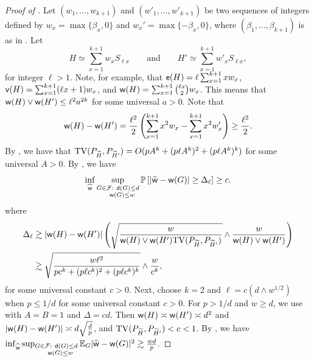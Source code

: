 \begin{proof}[Proof of ]
Let $ (w_1, \dots, w_{k+1}) $ and $ (w'_1, \dots, w'_{k+1}) $ be two sequences of integers defined by  $w_x=\max\{\beta_x,0\}$ and $w_x'=\max\{-\beta_x,0\}$, where $ (\beta_1, \dots, \beta_{k+1}) $ is as in . Let 
\begin{equation*} 
H \simeq \sum_{x=1}^{k+1} w_x S_{\ell x} \qquad \text{and} \qquad H' \simeq \sum_{x=1}^{k+1} w'_x S_{\ell x},
\end{equation*}
for integer $ \ell > 1 $.
Note, for example, that $ {\mathsf{e}}(H) = \ell\sum_{x=1}^{k+1} xw_x $, $ {\mathsf{v}}(H) = \sum_{x=1}^{k+1} (\ell x+1)w_x $, and $ {\mathsf{w}}(H) =\sum_{x=1}^{k+1} \binom{\ell x}{2}w_x $. This means that $ {\mathsf{w}}(H) \vee {\mathsf{w}}(H') \leq \ell^2 a^{2k} $ for some universal $ a > 0 $. Note that
\begin{equation*}
{\mathsf{w}}(H) - {\mathsf{w}}(H') = \frac{\ell^2}{2}\left(\sum_{x=1}^{k+1} x^2w_x - \sum_{x=1}^{k+1} x^2w'_x\right) \geq \frac{\ell^2}{2}.
\end{equation*}
By , we have that ${\rm TV}(P_{{\widetilde{H}}}, P_{{\widetilde{H}}'}) = O(pA^k + (p\ell A^k)^2 + (p\ell A^k)^k) $ for some universal $ A > 0 $.
By , we have
\begin{equation*}
\inf_{\widehat{{\mathsf{w}}}}\sup_{\substack{G \in {\mathcal{F}}: ~{\mathsf{d}}(G)\leq d\\ ~~~{\mathsf{w}}(G) \leq w}}\mathbb{P}\left[ |\widehat{{\mathsf{w}}}-{\mathsf{w}}(G)| \geq \Delta_{\ell} \right] \geq c.
\end{equation*}
where
\begin{align*}
\Delta_{\ell} & \gtrsim |{\mathsf{w}}(H) - {\mathsf{w}}(H')|\left(\sqrt{ \frac{w}{{\mathsf{w}}(H) \vee {\mathsf{w}}(H') {\rm TV}(P_{{\widetilde{H}}}, P_{{\widetilde{H}}'})}}  \wedge \frac{w}{{\mathsf{w}}(H) \vee {\mathsf{w}}(H')}\right) \\
& \gtrsim \sqrt{ \frac{w\ell^2}{pc^k + (p\ell c^k)^2 + (p\ell c^k)^{k}}}  \wedge \frac{w}{c^k},
\end{align*}
for some universal constant $ c > 0 $.
Next, choose $ k = 2 $ and $ \ell = c(d \wedge w^{1/2}) $ when $ p \leq 1/d $ for some universal constant $ c > 0 $. For $ p > 1/d $ and $ w \geq d $, we use  with $ A = B = 1 $ and $ \Delta = cd $.  Then $ {\mathsf{w}}(H) \asymp {\mathsf{w}}(H') \asymp d^2 $ and $ |{\mathsf{w}}(H) - {\mathsf{w}}(H')| \asymp d\sqrt{\frac{d}{p}} $, and $ {\rm TV}(P_{{\widetilde{H}}}, P_{{\widetilde{H}}'}) < c < 1 $. By , we have $ \inf_{\widehat{{\mathsf{w}}}}\sup_{\substack{G \in {\mathcal{F}}: ~{\mathsf{d}}(G)\leq d\\ ~~~{\mathsf{w}}(G) \leq w}}\mathbb{E}_G|\widehat{{\mathsf{w}}}-{\mathsf{w}}(G)|^2 \gtrsim \frac{wd}{p} $.
\end{proof}


